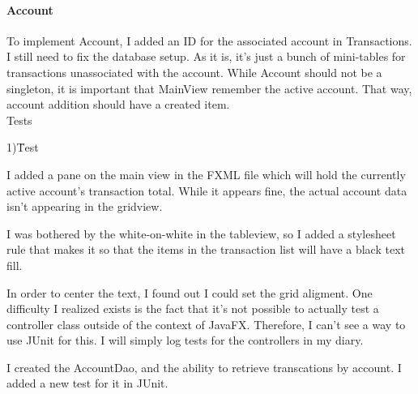 \documentclass[letterpaper,12pt,oneside,titlepage,onecolumn]{article}
\begin{document}
\paragraph{Account}
To implement Account, I added an ID for the associated account in Transactions.\\
I still need to fix the database setup. As it is, it's just a bunch of mini-tables for transactions unassociated with the account.
While Account should not be a singleton, it is important that MainView remember the active account. That way, account addition should have a created item.
\\Tests
\begin{tabbing}
 1)\=Test 
\end{tabbing}
I added a pane on the main view in the FXML file which will hold the currently active account's transaction total. While it appears fine, the actual account data isn't appearing in the gridview.\par
I was bothered by the white-on-white in the tableview, so I added a stylesheet rule that makes it so that the items in the transaction list will have a black text fill.\par
In order to center the text, I found out I could set the grid aligment.
One difficulty I realized exists is the fact that it's not possible to actually test a controller class outside of the context of JavaFX. Therefore, I can't see a way to use JUnit for this. I will simply log tests for the controllers in my diary.\par
I created the AccountDao, and the ability to retrieve transcations by account. I added a new test for it in JUnit.
\end{document}
